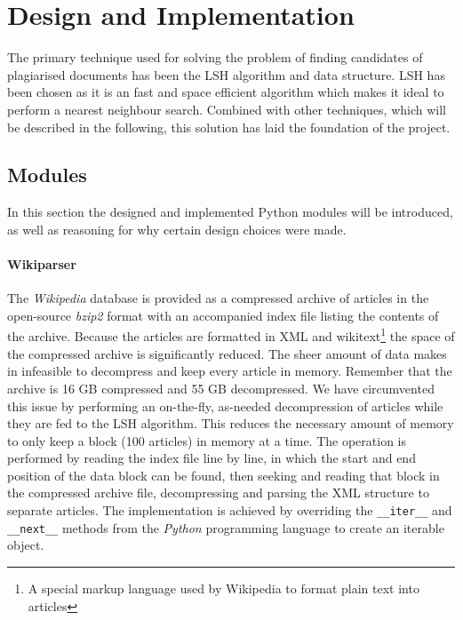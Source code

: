 \section{Design and Implementation}
The primary technique used for solving the problem of finding candidates of plagiarised documents has been the LSH algorithm and data structure. LSH has been chosen as it is an fast and space efficient algorithm which makes it ideal to perform a nearest neighbour search. Combined with other techniques, which will be described in the following, this solution has laid the foundation of the project.

\subsection{Modules}
In this section the designed and implemented Python modules will be introduced, as well as reasoning for why certain design choices were made.

\paragraph{Wikiparser}
The \emph{Wikipedia} database is provided as a compressed archive of articles in the open-source \emph{bzip2} format with an accompanied index file listing the contents of the archive. Because the articles are formatted in XML and wikitext\footnote{A special markup language used by Wikipedia to format plain text into articles} the space of the compressed archive is significantly reduced. The sheer amount of data makes in infeasible to decompress and keep every article in memory. Remember that the archive is 16 GB compressed and 55 GB decompressed. We have circumvented this issue by performing an on-the-fly, as-needed decompression of articles while they are fed to the LSH algorithm. This reduces the necessary amount of memory to only keep a block (100 articles) in memory at a time. The operation is performed by reading the index file line by line, in which the start and end position of the data block can be found, then seeking and reading that block in the compressed archive file, decompressing and parsing the XML structure to separate articles. The implementation is achieved by overriding the \texttt{\_\_iter\_\_} and \texttt{\_\_next\_\_} methods from the \emph{Python} programming language to create an iterable object.

